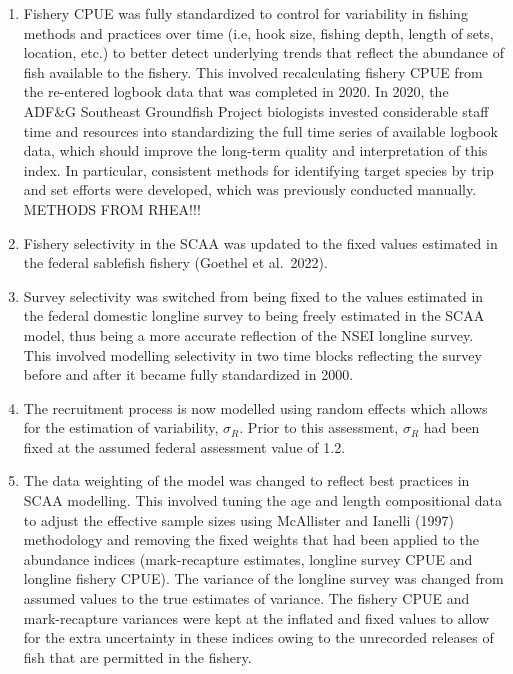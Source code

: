 \documentclass[
]{article}
\begin{document}
\begin{enumerate}
\def\labelenumi{\arabic{enumi}.}
\item
  Fishery CPUE was fully standardized to control for variability in
  fishing methods and practices over time (i.e, hook size, fishing
  depth, length of sets, location, etc.) to better detect underlying
  trends that reflect the abundance of fish available to the fishery.
  This involved recalculating fishery CPUE from the re-entered logbook
  data that was completed in 2020. In 2020, the ADF\&G Southeast
  Groundfish Project biologists invested considerable staff time and
  resources into standardizing the full time series of available logbook
  data, which should improve the long-term quality and interpretation of
  this index. In particular, consistent methods for identifying target
  species by trip and set efforts were developed, which was previously
  conducted manually. {METHODS FROM RHEA!!!}
\item
  Fishery selectivity in the SCAA was updated to the fixed values
  estimated in the federal sablefish fishery (Goethel et al.~2022).
\item
  Survey selectivity was switched from being fixed to the values
  estimated in the federal domestic longline survey to being freely
  estimated in the SCAA model, thus being a more accurate reflection of
  the NSEI longline survey. This involved modelling selectivity in two
  time blocks reflecting the survey before and after it became fully
  standardized in 2000.
\item
  The recruitment process is now modelled using random effects which
  allows for the estimation of variability, \(\sigma_R\). Prior to this
  assessment, \(\sigma_R\) had been fixed at the assumed federal
  assessment value of 1.2.
\item
  The data weighting of the model was changed to reflect best practices
  in SCAA modelling. This involved tuning the age and length
  compositional data to adjust the effective sample sizes using
  McAllister and Ianelli (1997) methodology and removing the fixed
  weights that had been applied to the abundance indices (mark-recapture
  estimates, longline survey CPUE and longline fishery CPUE). The
  variance of the longline survey was changed from assumed values to the
  true estimates of variance. The fishery CPUE and mark-recapture
  variances were kept at the inflated and fixed values to allow for the
  extra uncertainty in these indices owing to the unrecorded releases of
  fish that are permitted in the fishery.
\end{enumerate}
\end{document}
